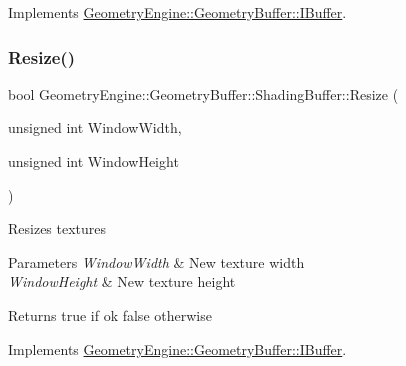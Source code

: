 Implements \mbox{\hyperlink{class_geometry_engine_1_1_geometry_buffer_1_1_i_buffer_ace4f0f514bf5a96790fbfffe515dcc0b}{Geometry\+Engine\+::\+Geometry\+Buffer\+::\+I\+Buffer}}.

\mbox{\label{class_geometry_engine_1_1_geometry_buffer_1_1_shading_buffer_a154d3f1ba318675149ebac34471e0aec}} 
\subsubsection{\texorpdfstring{Resize()}{Resize()}}
{\footnotesize\ttfamily bool Geometry\+Engine\+::\+Geometry\+Buffer\+::\+Shading\+Buffer\+::\+Resize (\begin{DoxyParamCaption}\item[{unsigned int}]{Window\+Width,  }\item[{unsigned int}]{Window\+Height }\end{DoxyParamCaption})\hspace{0.3cm}{\ttfamily [virtual]}}

Resizes textures 
\begin{DoxyParams}{Parameters}
{\em Window\+Width} & New texture width \\
\hline
{\em Window\+Height} & New texture height \\
\hline
\end{DoxyParams}
\begin{DoxyReturn}{Returns}
true if ok false otherwise 
\end{DoxyReturn}


Implements \mbox{\hyperlink{class_geometry_engine_1_1_geometry_buffer_1_1_i_buffer_a3b764e340ccb06bee072d1bd95b007df}{Geometry\+Engine\+::\+Geometry\+Buffer\+::\+I\+Buffer}}.

\mbox{\label{class_geometry_engine_1_1_geometry_buffer_1_1_shading_buffer_a7c5594fbcc9e0cd43f4b6ebb8e9b9197}} 
